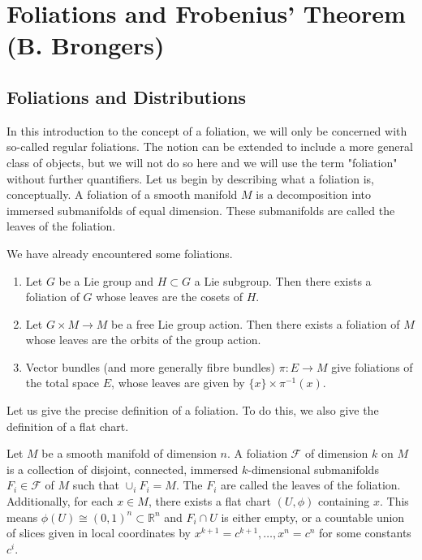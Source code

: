 \chapter{Foliations and Frobenius' Theorem (B. Brongers)}

\section{Foliations and Distributions}

In this introduction to the concept of a foliation, we will only be concerned with so-called regular foliations. The notion can be extended to include a more general class of objects, but we will not do so here and we will use the term "foliation" without further quantifiers. Let us begin by describing what a foliation is, conceptually. A foliation of a smooth manifold $M$ is a decomposition into immersed submanifolds of equal dimension. These submanifolds are called the leaves of the foliation. 
\begin{example}
  We have already encountered some foliations.
  \begin{enumerate}
    \item Let $G$ be a Lie group and $H\subset G$ a Lie subgroup. Then there exists a foliation of $G$ whose leaves are the cosets of $H$.
    \item Let $G\times M\to M$ be a free Lie group action. Then there exists a foliation of $M$ whose leaves are the orbits of the group action.
    \item Vector bundles (and more generally fibre bundles) $\pi:E\to M$ give foliations of the total space $E$, whose leaves are given by $\{x\}\times \pi^{-1}(x)$.
  \end{enumerate}
\end{example}
Let us give the precise definition of a foliation. To do this, we also give the definition of a flat chart.
\begin{definition}
  Let $M$ be a smooth manifold of dimension $n$. A foliation $\mathcal{F}$ of dimension $k$ on $M$ is a collection of disjoint, connected, immersed $k$-dimensional submanifolds $F_i\in\mathcal{F}$ of $M$ such that $\cup_iF_i=M$. The $F_i$ are called the leaves of the foliation. Additionally, for each $x\in M$, there exists a flat chart $(U,\phi)$ containing $x$. This means $\phi(U)\cong (0,1)^n\subset\mathbb{R}^n$ and $F_i\cap U$ is either empty, or a countable union of slices given in local coordinates by $x^{k+1}=c^{k+1},\dots,x^n=c^n$ for some constants $c^i$.
\end{definition}
